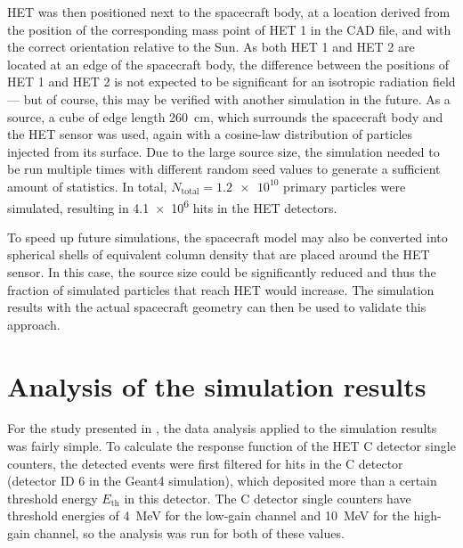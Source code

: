 HET was then positioned next to the spacecraft body, at a location derived from the position of the corresponding mass point of HET 1 in the CAD file, and with the correct orientation relative to the Sun. As both HET 1 and HET 2 are located at an edge of the spacecraft body, the difference between the positions of HET 1 and HET 2 is not expected to be significant for an isotropic radiation field --- but of course, this may be verified with another simulation in the future. As a source, a cube of edge length \SI{260}{\centi\meter}, which surrounds the spacecraft body and the HET sensor was used, again with a cosine-law distribution of particles injected from its surface. Due to the large source size, the simulation needed to be run multiple times with different random seed values to generate a sufficient amount of statistics. In total, $N_\text{total} = \num{1.2e10}$ primary particles were simulated, resulting in \num{4.1e6} hits in the HET detectors.

To speed up future simulations, the spacecraft model may also be converted into spherical shells of equivalent column density that are placed around the HET sensor. In this case, the source size could be significantly reduced and thus the fraction of simulated particles that reach HET would increase. The simulation results with the actual spacecraft geometry can then be used to validate this approach.

\section{Analysis of the simulation results}

For the study presented in \citet{Forstner-2021-SolO}, the data analysis applied to the simulation results was fairly simple. To calculate the response function of the HET C detector single counters, the detected events were first filtered for hits in the C detector (detector ID 6 in the Geant4 simulation), which deposited more than a certain threshold energy $E_\text{th}$ in this detector. The C detector single counters have threshold energies of \SI{4}{\mega\electronvolt} for the low-gain channel and \SI{10}{\mega\electronvolt} for the high-gain channel, so the analysis was run for both of these values.

